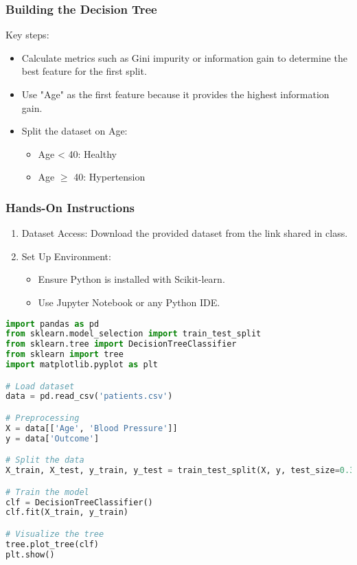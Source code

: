 \documentclass[aspectratio=169]{beamer}
\begin{document}
\begin{frame}[fragile]
    \frametitle{Building the Decision Tree}
    Key steps:
    \begin{itemize}
        \item Calculate metrics such as Gini impurity or information gain to determine the best feature for the first split.
        \item Use "Age" as the first feature because it provides the highest information gain.
        \item Split the dataset on Age:
            \begin{itemize}
                \item Age < 40: Healthy
                \item Age $\geq$ 40: Hypertension
            \end{itemize}
    \end{itemize}
\end{frame}

\begin{frame}[fragile]
    \frametitle{Hands-On Instructions}
    \begin{enumerate}
        \item Dataset Access: Download the provided dataset from the link shared in class.
        \item Set Up Environment:
            \begin{itemize}
                \item Ensure Python is installed with Scikit-learn.
                \item Use Jupyter Notebook or any Python IDE.
            \end{itemize}
    \end{enumerate}
    \begin{lstlisting}[language=Python]
import pandas as pd
from sklearn.model_selection import train_test_split
from sklearn.tree import DecisionTreeClassifier
from sklearn import tree
import matplotlib.pyplot as plt

# Load dataset
data = pd.read_csv('patients.csv')

# Preprocessing
X = data[['Age', 'Blood Pressure']]
y = data['Outcome']

# Split the data
X_train, X_test, y_train, y_test = train_test_split(X, y, test_size=0.3)

# Train the model
clf = DecisionTreeClassifier()
clf.fit(X_train, y_train)

# Visualize the tree
tree.plot_tree(clf)
plt.show()
    \end{lstlisting}
\end{frame}
\end{document}
